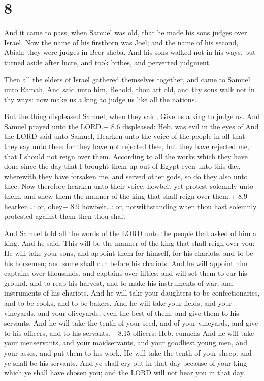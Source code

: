 \hypertarget{section-7}{%
\section{8}\label{section-7}}

 And it came to pass, when Samuel was old, that he made his
sons judges over Israel.  Now the name of his firstborn was
Joel; and the name of his second, Abiah: they were judges in Beer-sheba.
 And his sons walked not in his ways, but turned aside after
lucre, and took bribes, and perverted judgment.

 Then all the elders of Israel gathered themselves together,
and came to Samuel unto Ramah,  And said unto him, Behold,
thou art old, and thy sons walk not in thy ways: now make us a king to
judge us like all the nations.

 But the thing displeased Samuel, when they said, Give us
a king to judge us. And Samuel prayed unto the LORD.+ 8.6 displeased:
Heb. was evil in the eyes of  And the LORD said unto Samuel,
Hearken unto the voice of the people in all that they say unto thee: for
they have not rejected thee, but they have rejected me, that I should
not reign over them.  According to all the works which they
have done since the day that I brought them up out of Egypt even unto
this day, wherewith they have forsaken me, and served other gods, so do
they also unto thee.  Now therefore hearken unto their
voice: howbeit yet protest solemnly unto them, and shew them the manner
of the king that shall reign over them.+ 8.9 hearken\ldots: or, obey+
8.9 howbeit\ldots: or, notwithstanding when thou hast solemnly protested
against them then thou shalt

 And Samuel told all the words of the LORD unto the
people that asked of him a king.  And he said, This will be
the manner of the king that shall reign over you: He will take your
sons, and appoint them for himself, for his chariots, and to be his
horsemen; and some shall run before his chariots.  And he
will appoint him captains over thousands, and captains over fifties; and
will set them to ear his ground, and to reap his harvest, and to make
his instruments of war, and instruments of his chariots. 
And he will take your daughters to be confectionaries, and to be cooks,
and to be bakers.  And he will take your fields, and your
vineyards, and your oliveyards, even the best of them, and give them to
his servants.  And he will take the tenth of your seed, and
of your vineyards, and give to his officers, and to his servants.+ 8.15
officers: Heb. eunuchs  And he will take your menservants,
and your maidservants, and your goodliest young men, and your asses, and
put them to his work.  He will take the tenth of your
sheep: and ye shall be his servants.  And ye shall cry out
in that day because of your king which ye shall have chosen you; and the
LORD will not hear you in that day.

